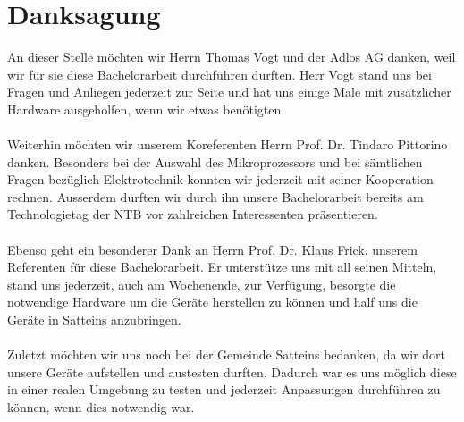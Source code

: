 \section{Danksagung}
An dieser Stelle möchten wir Herrn Thomas Vogt und der Adlos AG danken, weil wir für sie diese Bachelorarbeit durchführen durften. Herr Vogt stand uns bei Fragen und Anliegen jederzeit zur Seite und hat uns einige Male mit zusätzlicher Hardware ausgeholfen, wenn wir etwas benötigten.\\\\
Weiterhin möchten wir unserem Koreferenten Herrn Prof. Dr. Tindaro Pittorino danken. Besonders bei der Auswahl des Mikroprozessors und bei sämtlichen Fragen bezüglich Elektrotechnik konnten wir jederzeit mit seiner Kooperation rechnen. Ausserdem durften wir durch ihn unsere Bachelorarbeit bereits am Technologietag der NTB vor zahlreichen Interessenten präsentieren.\\\\
Ebenso geht ein besonderer Dank an Herrn Prof. Dr. Klaus Frick, unserem Referenten für diese Bachelorarbeit. Er unterstütze uns mit all seinen Mitteln, stand uns jederzeit, auch am Wochenende, zur Verfügung, besorgte die notwendige Hardware um die Geräte herstellen zu können und half uns die Geräte in Satteins anzubringen.\\\\
Zuletzt möchten wir uns noch bei der Gemeinde Satteins bedanken, da wir dort unsere Geräte aufstellen und austesten durften. Dadurch war es uns möglich diese in einer realen Umgebung zu testen und jederzeit Anpassungen durchführen zu können, wenn dies notwendig war.
\newpage
